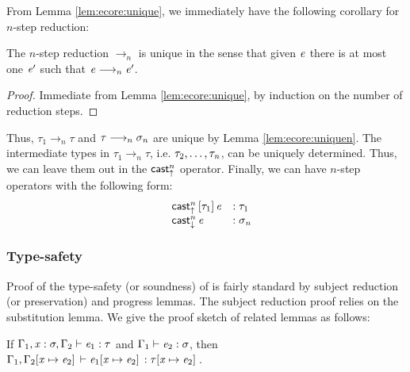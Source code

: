 From Lemma \ref{lem:ecore:unique}, we immediately have the following corollary for $n$-step reduction:

\begin{lem}\label{lem:ecore:uniquen}
	The $n$-step reduction $ \longrightarrow_n $ is unique in the sense that given $\mathit{e}$ there is at most one $\mathit{e'}$ such that $\mathit{e}  \longrightarrow_n  \mathit{e'}$.
\end{lem}

\begin{proof}
	Immediate from Lemma \ref{lem:ecore:unique}, by induction on the number of reduction steps.
\end{proof}

Thus, $\tau_{{\mathrm{1}}}  \longrightarrow_n  \tau$ and $\tau  \longrightarrow_n  \sigma_{\mathit{n}}$ are unique by Lemma \ref{lem:ecore:uniquen}. The intermediate types in $\tau_{{\mathrm{1}}}  \longrightarrow_n  \tau$, i.e. $\tau_{{\mathrm{2}}}, \dots, \tau_{\mathit{n}}$, can be uniquely determined. Thus, we can leave them out in the $ \mathsf{cast}_{\uparrow}^n $ operator. Finally, we can have $n$-step \cast operators with the following form:
\[\begin{array}{lll}
    &\mathsf{cast}_{\uparrow}^n \, [  \tau_{{\mathrm{1}}}  ] \,  \mathit{e} & : \tau_{{\mathrm{1}}} \\
    &\mathsf{cast}_{\downarrow}^n \, \mathit{e} & : \sigma_{\mathit{n}}
\end{array}\]

\subsubsection{Type-safety}
Proof of the type-safety (or soundness) of \ecore is fairly standard by subject reduction (or preservation) and progress lemmas. The subject reduction proof relies on the substitution lemma. We give the proof sketch of related lemmas as follows:

\begin{lem}\label{lem:ecore:subst}
	If $\Gamma_{{\mathrm{1}}}  ,  \mathit{x}  :  \sigma  ,  \Gamma_{{\mathrm{2}}}  \vdash  \mathit{e_{{\mathrm{1}}}}  :  \tau$ and $\Gamma_{{\mathrm{1}}}  \vdash  \mathit{e_{{\mathrm{2}}}}  :  \sigma$, then $\Gamma_{{\mathrm{1}}}  ,  \Gamma_{{\mathrm{2}}}  [  \mathit{x}  \mapsto  \mathit{e_{{\mathrm{2}}}}  ] \,  \vdash  \mathit{e_{{\mathrm{1}}}}  [  \mathit{x}  \mapsto  \mathit{e_{{\mathrm{2}}}}  ] \,  :  \tau  [  \mathit{x}  \mapsto  \mathit{e_{{\mathrm{2}}}}  ] \,$.
\end{lem}

